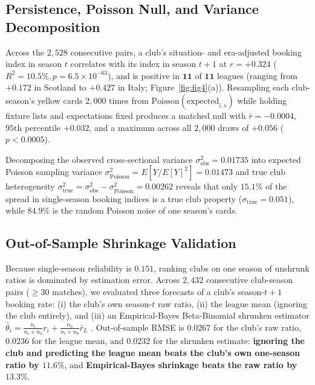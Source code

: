 \documentclass[10pt,twocolumn]{article}
\begin{document}
\subsection{Persistence, Poisson Null, and Variance Decomposition}
Across the $2,528$ consecutive pairs, a club's situation- and era-adjusted booking index in season $t$ correlates with its index in season $t+1$ at $r = \mathbf{+0.324}$ ($R^2 = 10.5\%, p = 6.5\times 10^{-63}$), and is positive in $\mathbf{11}$ of $\mathbf{11}$ leagues (ranging from $+0.172$ in Scotland to $+0.427$ in Italy; Figure~\ref{fig:fig4}(a)). Resampling each club-season's yellow cards $2,000$ times from $\text{Poisson}(\text{expected}_{i,s})$ while holding fixture lists and expectations fixed produces a matched null with $\bar{r} = -0.0004$, $95\text{th}$ percentile $+0.032$, and a maximum across all $2,000$ draws of $\mathbf{+0.056}$ ($p < 0.0005$).

Decomposing the observed cross-sectional variance $\sigma^2_{\text{obs}} = 0.01735$ into expected Poisson sampling variance $\sigma^2_{\text{Poisson}} = E[Y / E[Y]^2] = 0.01473$ and true club heterogeneity $\sigma^2_{\text{true}} = \sigma^2_{\text{obs}} - \sigma^2_{\text{Poisson}} = 0.00262$ reveals that only $\mathbf{15.1\%}$ of the spread in single-season booking indices is a true club property ($\sigma_{\text{true}} = \mathbf{0.051}$), while $\mathbf{84.9\%}$ is the random Poisson noise of one season's cards.

\subsection{Out-of-Sample Shrinkage Validation}
Because single-season reliability is $0.151$, ranking clubs on one season of unshrunk ratios is dominated by estimation error. Across $2,432$ consecutive club-season pairs ($\ge 30$ matches), we evaluated three forecasts of a club's season-$t+1$ booking rate: (i) the club's own season-$t$ raw ratio, (ii) the league mean (ignoring the club entirely), and (iii) an Empirical-Bayes Beta-Binomial shrunken estimator $\hat{\theta}_i = \frac{n_i}{n_i + n_0} r_i + \frac{n_0}{n_i + n_0} \bar{r}_L$ \citep{efron1975stein,brown2008season}. Out-of-sample RMSE is $0.0267$ for the club's raw ratio, $0.0236$ for the league mean, and $0.0232$ for the shrunken estimate: \textbf{ignoring the club and predicting the league mean beats the club's own one-season ratio by $11.6\%$}, and \textbf{Empirical-Bayes shrinkage beats the raw ratio by $13.3\%$}.
\end{document}
